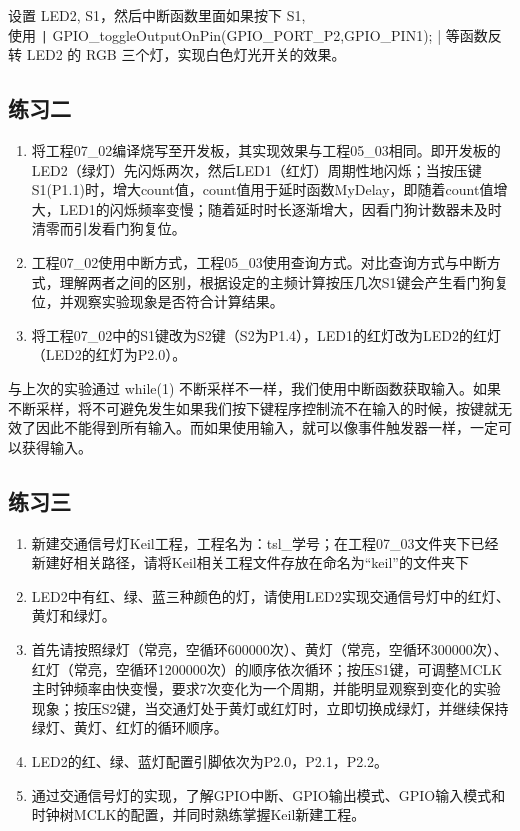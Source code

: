 \documentclass[a4paper,10pt,UTF8]{paper}
\numberwithin{equation}{section}
\numberwithin{figure}{section}
\begin{document}
设置 LED2, S1，然后中断函数里面如果按下 S1, 
\\ 使用 \texttt| GPIO_toggleOutputOnPin(GPIO_PORT_P2,GPIO_PIN1); | 等函数反转 LED2 的 RGB 三个灯，实现白色灯光开关的效果。

\subsection{练习二}

\begin{enumerate}
  \item 将工程07\_02编译烧写至开发板，其实现效果与工程05\_03相同。即开发板的LED2（绿灯）先闪烁两次，然后LED1（红灯）周期性地闪烁；当按压键S1(P1.1)时，增大count值，count值用于延时函数MyDelay，即随着count值增大，LED1的闪烁频率变慢；随着延时时长逐渐增大，因看门狗计数器未及时清零而引发看门狗复位。
  \item 工程07\_02使用中断方式，工程05\_03使用查询方式。对比查询方式与中断方式，理解两者之间的区别，根据设定的主频计算按压几次S1键会产生看门狗复位，并观察实验现象是否符合计算结果。
  \item 将工程07\_02中的S1键改为S2键（S2为P1.4），LED1的红灯改为LED2的红灯（LED2的红灯为P2.0）。
\end{enumerate}

与上次的实验通过 while(1) 不断采样不一样，我们使用中断函数获取输入。如果不断采样，将不可避免发生如果我们按下键程序控制流不在输入的时候，按键就无效了因此不能得到所有输入。而如果使用输入，就可以像事件触发器一样，一定可以获得输入。

\subsection{练习三}

\begin{enumerate}
  \item 新建交通信号灯Keil工程，工程名为：tsl\_学号；在工程07\_03文件夹下已经新建好相关路径，请将Keil相关工程文件存放在命名为“keil”的文件夹下
  \item LED2中有红、绿、蓝三种颜色的灯，请使用LED2实现交通信号灯中的红灯、黄灯和绿灯。
  \item 首先请按照绿灯（常亮，空循环600000次）、黄灯（常亮，空循环300000次）、红灯（常亮，空循环1200000次）的顺序依次循环；按压S1键，可调整MCLK主时钟频率由快变慢，要求7次变化为一个周期，并能明显观察到变化的实验现象；按压S2键，当交通灯处于黄灯或红灯时，立即切换成绿灯，并继续保持绿灯、黄灯、红灯的循环顺序。
  \item LED2的红、绿、蓝灯配置引脚依次为P2.0，P2.1，P2.2。
  \item 通过交通信号灯的实现，了解GPIO中断、GPIO输出模式、GPIO输入模式和时钟树MCLK的配置，并同时熟练掌握Keil新建工程。
\end{enumerate}
\end{document}
